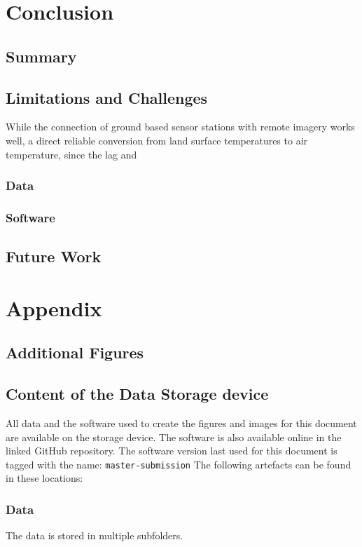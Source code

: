 \documentclass[12pt,a4paper, english,twoside]{article}
\begin{document}
\section{Conclusion}\label{sec:conclusion}
\subsection{Summary}

\subsection{Limitations and Challenges}
While the connection of ground based sensor stations with remote imagery works well, a direct reliable conversion from land surface temperatures to air temperature, since the lag and 

\subsubsection{Data}
\subsubsection{Software}

% 
\subsection{Future Work}

\newpage
\section{Appendix}
\subsection{Additional Figures}
\subsection{Content of the Data Storage device}
All data and the software used to create the figures and images for this document are available on the storage device.
The software is also available online in the linked GitHub repository.
The software version last used for this document is tagged with the name: \texttt{master-submission}
The following artefacts can be found in these locations:
\subsubsection{Data}
The data is stored in multiple subfolders. 
\end{document}
